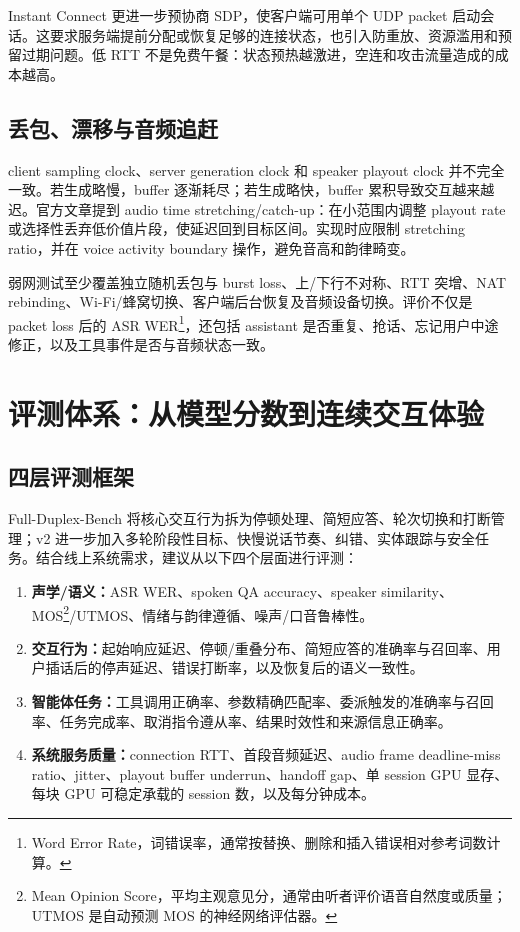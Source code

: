 Instant Connect 更进一步预协商 SDP，使客户端可用单个 UDP packet 启动会话\cite{openai2026continuous}。这要求服务端提前分配或恢复足够的连接状态，也引入防重放、资源滥用和预留过期问题。低 RTT 不是免费午餐：状态预热越激进，空连和攻击流量造成的成本越高。

\subsection{丢包、漂移与音频追赶}

client sampling clock、server generation clock 和 speaker playout clock 并不完全一致。若生成略慢，buffer 逐渐耗尽；若生成略快，buffer 累积导致交互越来越迟。官方文章提到 audio time stretching/catch-up\cite{openai2026continuous}：在小范围内调整 playout rate 或选择性丢弃低价值片段，使延迟回到目标区间。实现时应限制 stretching ratio，并在 voice activity boundary 操作，避免音高和韵律畸变。

弱网测试至少覆盖独立随机丢包与 burst loss、上/下行不对称、RTT 突增、NAT rebinding、Wi-Fi/蜂窝切换、客户端后台恢复及音频设备切换。评价不仅是 packet loss 后的 ASR WER\footnote{Word Error Rate，词错误率，通常按替换、删除和插入错误相对参考词数计算。}，还包括 assistant 是否重复、抢话、忘记用户中途修正，以及工具事件是否与音频状态一致。

\section{评测体系：从模型分数到连续交互体验}

\subsection{四层评测框架}

Full-Duplex-Bench 将核心交互行为拆为停顿处理、简短应答、轮次切换和打断管理\cite{lin2025fullduplexbench}；v2 进一步加入多轮阶段性目标、快慢说话节奏、纠错、实体跟踪与安全任务\cite{lin2026fullduplexbenchv2}。结合线上系统需求，建议从以下四个层面进行评测：

\begin{enumerate}
  \item \textbf{声学/语义：}ASR WER、spoken QA accuracy、speaker similarity、MOS\footnote{Mean Opinion Score，平均主观意见分，通常由听者评价语音自然度或质量；UTMOS 是自动预测 MOS 的神经网络评估器。}/UTMOS、情绪与韵律遵循、噪声/口音鲁棒性。
  \item \textbf{交互行为：}起始响应延迟、停顿/重叠分布、简短应答的准确率与召回率、用户插话后的停声延迟、错误打断率，以及恢复后的语义一致性。
  \item \textbf{智能体任务：}工具调用正确率、参数精确匹配率、委派触发的准确率与召回率、任务完成率、取消指令遵从率、结果时效性和来源信息正确率。
  \item \textbf{系统服务质量：}connection RTT、首段音频延迟、audio frame deadline-miss ratio、jitter、playout buffer underrun、handoff gap、单 session GPU 显存、每块 GPU 可稳定承载的 session 数，以及每分钟成本。
\end{enumerate}


